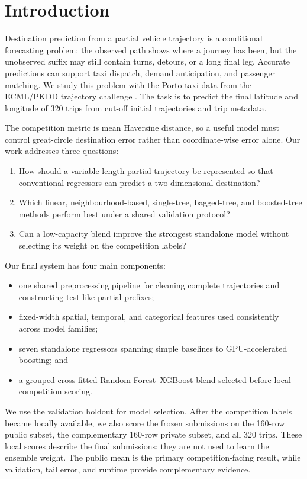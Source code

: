 \section{Introduction}

Destination prediction from a partial vehicle trajectory is a conditional forecasting problem: the observed path shows where a journey has been, but the unobserved suffix may still contain turns, detours, or a long final leg.  Accurate predictions can support taxi dispatch, demand anticipation, and passenger matching.  We study this problem with the Porto taxi data from the ECML/PKDD trajectory challenge \citep{moreira2015taxi}.  The task is to predict the final latitude and longitude of 320 trips from cut-off initial trajectories and trip metadata.

The competition metric is mean Haversine distance, so a useful model must control great-circle destination error rather than coordinate-wise error alone.  Our work addresses three questions:

\begin{enumerate}
  \item How should a variable-length partial trajectory be represented so that conventional regressors can predict a two-dimensional destination?
  \item Which linear, neighbourhood-based, single-tree, bagged-tree, and boosted-tree methods perform best under a shared validation protocol?
  \item Can a low-capacity blend improve the strongest standalone model without selecting its weight on the competition labels?
\end{enumerate}

Our final system has four main components:

\begin{itemize}
  \item one shared preprocessing pipeline for cleaning complete trajectories and constructing test-like partial prefixes;
  \item fixed-width spatial, temporal, and categorical features used consistently across model families;
  \item seven standalone regressors spanning simple baselines to GPU-accelerated boosting; and
  \item a grouped cross-fitted Random Forest--XGBoost blend selected before local competition scoring.
\end{itemize}

We use the validation holdout for model selection.  After the competition labels became locally available, we also score the frozen submissions on the 160-row public subset, the complementary 160-row private subset, and all 320 trips.  These local scores describe the final submissions; they are not used to learn the ensemble weight.  The public mean is the primary competition-facing result, while validation, tail error, and runtime provide complementary evidence.
